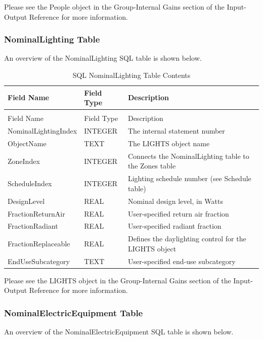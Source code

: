 Please see the People object in the Group-Internal Gains section of the Input-Output Reference for more information.

\subsubsection{NominalLighting Table}

An overview of the NominalLighting SQL table is shown below.

\begin{longtable}[c]{>{\raggedright}p{1.5in}>{\raggedright}p{1.5in}>{\raggedright}p{3.0in}}
\caption{SQL NominalLighting Table Contents \label{table:table-16.-sql-nominallighting-table-contents}} \tabularnewline
\toprule
Field Name & Field Type & Description \tabularnewline
\midrule
\endfirsthead

\caption[]{SQL NominalLighting Table Contents} \tabularnewline
\toprule
Field Name & Field Type & Description \tabularnewline
\midrule
\endhead

NominalLightingIndex & INTEGER & The internal statement number \tabularnewline
ObjectName & TEXT & The LIGHTS object name \tabularnewline
ZoneIndex & INTEGER & Connects the NominalLighting table to the Zones table \tabularnewline
ScheduleIndex & INTEGER & Lighting schedule number (see Schedule table) \tabularnewline
DesignLevel & REAL & Nominal design level, in Watts \tabularnewline
FractionReturnAir & REAL & User-specified return air fraction \tabularnewline
FractionRadiant & REAL & User-specified radiant fraction \tabularnewline
FractionReplaceable & REAL & Defines the daylighting control for the LIGHTS object \tabularnewline
EndUseSubcategory & TEXT & User-specified end-use subcategory \tabularnewline
\bottomrule
\end{longtable}

Please see the LIGHTS object in the Group-Internal Gains section of the Input-Output Reference for more information.

\subsubsection{NominalElectricEquipment Table}

An overview of the NominalElectricEquipment SQL table is shown below.

